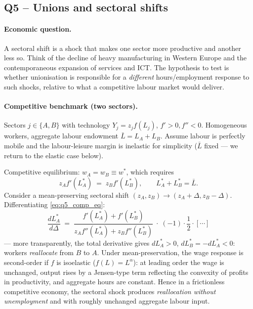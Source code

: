 \documentclass[11pt,a4paper]{article}
\begin{document}
\subsection*{Q5 -- Unions and sectoral shifts}

\paragraph{Economic question.}
A sectoral shift is a shock that makes one sector more productive and another less so. Think of the decline of heavy manufacturing in Western Europe and the contemporaneous expansion of services and ICT. The hypothesis to test is whether unionisation is responsible for a \emph{different} hours/employment response to such shocks, relative to what a competitive labour market would deliver.

\paragraph{Competitive benchmark (two sectors).}
Sectors $j\in\{A,B\}$ with technology $Y_j=z_j f(L_j)$, $f'>0,f''<0$. Homogeneous workers, aggregate labour endowment $\bar L=L_A+L_B$. Assume labour is perfectly mobile and the labour-leisure margin is inelastic for simplicity ($\bar L$ fixed --- we return to the elastic case below).

Competitive equilibrium: $w_A=w_B\equiv w^{*}$, which requires
\begin{equation}
z_A f'(L_A^{*})\;=\;z_B f'(L_B^{*}),\qquad L_A^{*}+L_B^{*}=\bar L.
\label{eq:q5_comp_eq}
\end{equation}
Consider a mean-preserving sectoral shift $(z_A,z_B)\to(z_A+\Delta,z_B-\Delta)$. Differentiating \eqref{eq:q5_comp_eq}:
\[
\frac{dL_A^{*}}{d\Delta}\;=\;\frac{f'(L_A^{*})+f'(L_B^{*})}{z_A f''(L_A^{*})+z_B f''(L_B^{*})}\;\cdot\;(-1)\cdot\frac{1}{2}\cdot[\cdots]
\]
--- more transparently, the total derivative gives $dL_A^{*}>0$, $dL_B^{*}=-dL_A^{*}<0$: workers \emph{reallocate} from $B$ to $A$. Under mean-preservation, the wage response is second-order if $f$ is isoelastic ($f(L)=L^{\alpha}$): at leading order the wage is unchanged, output rises by a Jensen-type term reflecting the convexity of profits in productivity, and aggregate hours are constant. Hence in a frictionless competitive economy, the sectoral shock produces \emph{reallocation without unemployment} and with roughly unchanged aggregate labour input.
\end{document}
